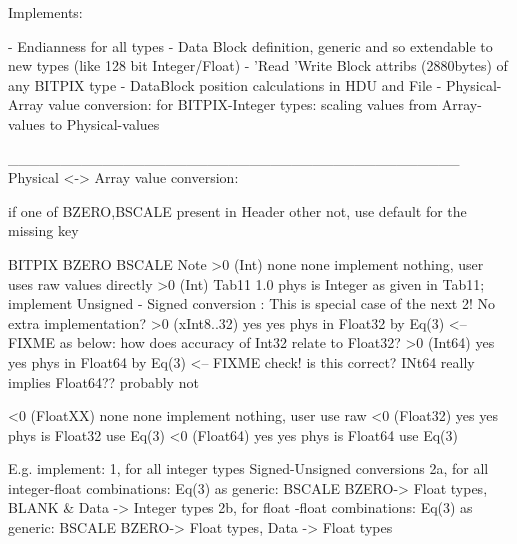 


Implements:

- Endianness for all types
- Data Block definition, generic and so extendable to new types (like 128 bit Integer/Float)
- 'Read 'Write Block attribs (2880bytes) of any BITPIX type
- DataBlock position calculations in HDU and File
- Physical-Array value conversion: for BITPIX-Integer types: scaling values from Array-values to Physical-values

___________________________________________
Physical <-> Array value conversion:

if one of BZERO,BSCALE present in Header other not, use default for the missing key

BITPIX   	BZERO 	BSCALE		Note
 >0 (Int)	none	none		implement nothing, user uses raw values directly
 >0 (Int)	Tab11	1.0		phys is Integer as given in Tab11; implement Unsigned - Signed conversion : This is special case of the next 2! No extra implementation?
 >0 (xInt8..32)	yes	yes		phys in Float32	by Eq(3) <-- FIXME as below: how does accuracy of Int32 relate to Float32?
 >0 (Int64)	yes	yes		phys in Float64	by Eq(3) <-- FIXME check! is this correct? INt64 really implies Float64?? probably not

 <0 (FloatXX)	none	none		implement nothing, user use raw
 <0 (Float32)	yes	yes		phys is Float32 use Eq(3)
 <0 (Float64)	yes	yes		phys is Float64 use Eq(3)

E.g. implement:
1, for all integer types Signed-Unsigned conversions
2a, for all integer-float combinations: Eq(3) as generic: BSCALE BZERO-> Float types,  BLANK & Data -> Integer types
2b, for     float  -float combinations: Eq(3) as generic: BSCALE BZERO-> Float types,  Data -> Float types

